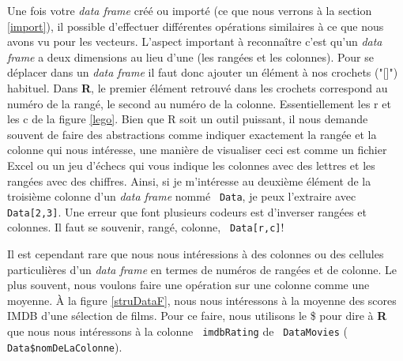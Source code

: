 \documentclass[10.5pt,a4paper]{article}
\newcommand{\rcode}[1]{\texttt{\color{rstudio} #1}}
\begin{document}
    
    Une fois votre \emph{data frame} créé ou importé (ce que nous verrons à la section \ref{import}), il possible d'effectuer différentes opérations similaires à ce que nous avons vu pour les vecteurs. L'aspect important à reconnaître c'est qu'un \emph{data frame} a deux dimensions au lieu d'une (les rangées et les colonnes). Pour se déplacer dans un \emph{data frame} il faut donc ajouter un élément à nos crochets ("[]") habituel. Dans \textbf{R}, le premier élément retrouvé dans les crochets correspond au numéro de la rangé, le second au numéro de la colonne. Essentiellement les r et les c de la figure \ref{lego}. Bien que R soit un outil puissant, il nous demande souvent de faire des abstractions comme indiquer exactement la rangée et la colonne qui nous intéresse, une manière de visualiser ceci est comme un fichier Excel ou un jeu d'échecs qui vous indique les colonnes avec des lettres et les rangées avec des chiffres. Ainsi, si je m'intéresse au deuxième élément de la troisième colonne d'un \emph{data frame} nommé \rcode{Data}, je peux l'extraire avec \rcode{Data[2,3]}. Une erreur que font plusieurs codeurs est d'inverser rangées et colonnes. Il faut se souvenir, rangé, colonne, \rcode{Data[r,c]}!
    
    Il est cependant rare que nous nous intéressions à des colonnes ou des cellules particulières d'un \emph{data frame} en termes de numéros de rangées et de colonne. Le plus souvent, nous voulons faire une opération sur une colonne comme une moyenne. À la figure \ref{struDataF}, nous nous intéressons à la moyenne des scores IMDB d'une sélection de films. Pour ce faire, nous utilisons le \$ pour dire à \textbf{R} que nous nous intéressons à la colonne \rcode{imdbRating} de \rcode{DataMovies} (\rcode{Data\$nomDeLaColonne}).
  
\end{document}

